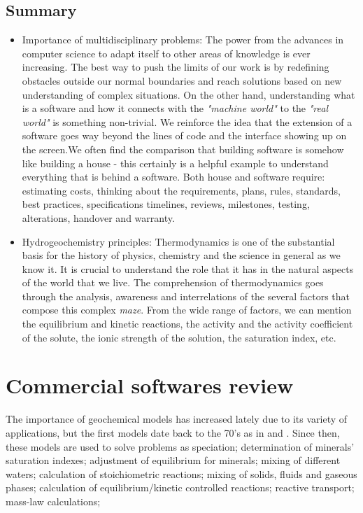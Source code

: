 \documentclass[ppgc,mestrado,English]{iiufrgs}
\begin{document}
\section{Summary}
\begin{itemize}
\item Importance of multidisciplinary problems: The power from the advances in computer science to adapt itself to other areas of knowledge is ever increasing. The best way to push the limits of our work is by redefining obstacles outside our normal boundaries and reach solutions based on new understanding of complex situations. On the other hand, understanding what is a software and how it connects with the \emph{"machine world"} to the \emph{"real world"} is something non-trivial. We reinforce the idea that the extension of a software goes way beyond the lines of code and the interface showing up on the screen.We often find the comparison that building software is somehow like building a house - this certainly is a helpful example to understand everything that is behind a software. Both house and software require: estimating costs, thinking about the requirements, plans, rules, standards, best practices, specifications timelines, reviews, milestones, testing, alterations, handover and warranty.
\item Hydrogeochemistry principles: Thermodynamics is one of the substantial basis for the history of physics, chemistry and the science in general as we know it. It is crucial to understand the role that it has in the natural aspects of the world that we live. The comprehension of thermodynamics goes through the analysis, awareness and interrelations of the several factors that compose this complex \emph{maze}. From the wide range of factors, we can mention the equilibrium and kinetic reactions, the activity and the activity coefficient of the solute, the ionic strength of the solution, the saturation index, etc.
\end{itemize}



\chapter{Commercial softwares review}
\label{chapter:review}
The importance of geochemical models has increased lately due to its variety of applications, but the first models date back to the 70’s as in \cite{Westall:76} and \cite{Wolery:79}. Since then, these models are used to solve problems as  speciation; determination of minerals' saturation indexes; adjustment of equilibrium for minerals; mixing of different waters; calculation of stoichiometric reactions; mixing of solids, fluids and gaseous phases; calculation of equilibrium/kinetic controlled reactions; reactive transport; mass-law calculations;
\end{document}
